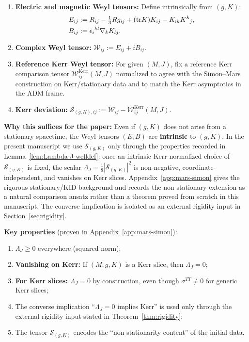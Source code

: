 \begin{definition}
\begin{enumerate}[label=\textup{(\roman*)}]
    \item \textbf{Electric and magnetic Weyl tensors:} Define intrinsically from $(g, K)$:
    \begin{align*}
    E_{ij} &:= R_{ij} - \tfrac{1}{3}Rg_{ij} + (\mathrm{tr} K)K_{ij} - K_{ik}K^k{}_j, \\
    B_{ij} &:= \epsilon_i{}^{kl}\nabla_k K_{lj}.
    \end{align*}
    \item \textbf{Complex Weyl tensor:} $\mathcal{W}_{ij} := E_{ij} + iB_{ij}$.
    \item \textbf{Reference Kerr Weyl tensor:} For given $(M, J)$, fix a reference Kerr comparison tensor $\mathcal{W}^{\mathrm{Kerr}}_{ij}(M, J)$ normalized to agree with the Simon--Mars construction on Kerr/stationary data and to match the Kerr asymptotics in the ADM frame.
    \item \textbf{Kerr deviation:} $\mathcal{S}_{(g,K),ij} := \mathcal{W}_{ij} - \mathcal{W}^{\mathrm{Kerr}}_{ij}(M, J)$.
\end{enumerate}

\textbf{Why this suffices for the paper:} Even if $(g, K)$ does not arise from a stationary spacetime, the Weyl tensors $(E, B)$ are \textbf{intrinsic} to $(g, K)$. In the present manuscript we use $\mathcal{S}_{(g,K)}$ only through the properties recorded in Lemma~\ref{lem:Lambda-J-welldef}: once an intrinsic Kerr-normalized choice of $\mathcal{S}_{(g,K)}$ is fixed, the scalar $\Lambda_J=\frac18|\mathcal{S}_{(g,K)}|^2$ is non-negative, coordinate-independent, and vanishes on Kerr slices. Appendix~\ref{app:mars-simon} gives the rigorous stationary/KID background and records the non-stationary extension as a natural comparison ansatz rather than a theorem proved from scratch in this manuscript. The converse implication is isolated as an external rigidity input in Section~\ref{sec:rigidity}.

\textbf{Key properties} (proven in Appendix~\ref{app:mars-simon}):
\begin{enumerate}[label=\textup{(\roman*)}]
    \item $\Lambda_J \geq 0$ everywhere (squared norm);
    \item \textbf{Vanishing on Kerr:} If $(M,g,K)$ is a Kerr slice, then $\Lambda_J = 0$;
    \item \textbf{For Kerr slices: $\Lambda_J = 0$} by construction, even though $\sigma^{TT} \neq 0$ for generic Kerr slices;
    \item The converse implication ``$\Lambda_J=0$ implies Kerr'' is used only through the external rigidity input stated in Theorem~\ref{thm:rigidity};
    \item The tensor $\mathcal{S}_{(g,K)}$ encodes the ``non-stationarity content'' of the initial data.
\end{enumerate}


\end{definition}
